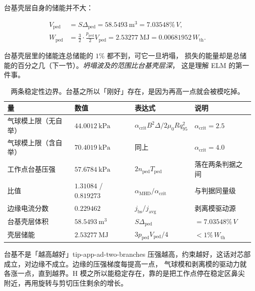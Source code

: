台基壳层自身的储能并不大：

\begin{equation}
\begin{aligned}
V_{\mathrm{ped}}&=S\Delta_{\mathrm{ped}}=58.5493\ \mathrm{m^3}=7.03548\%\,V,\\
W_{\mathrm{ped}}&=\frac{3}{2}\cdot\frac{p_{\mathrm{ped}}}{2}V_{\mathrm{ped}}
=2.53277\ \mathrm{MJ}=0.00681952\,W_{\mathrm{th}}.
\end{aligned}
\label{eq:app-ad-wped}
\end{equation}

台基壳层里的储能连总储能的 $1\%$ 都不到，可它一旦坍塌，
损失的能量却是总储能的百分之几（下一节）。\emph{坍塌波及的范围比台基壳层深}，
这是理解 ELM 的第一件事。

\begin{table}[htbp]
\centering
\small
\caption{两条稳定性边界。台基之所以「刚好」存在，是因为再高一点就会被模吃掉。}
\label{tab:app-ad-limits}
\begin{tabular}{p{3.6cm}p{3.2cm}p{3.9cm}p{4.2cm}}
\toprule
量 & 数值 & 表达式 & 说明 \\
\midrule
气球模上限（无自举） & $44.0012\ \mathrm{kPa}$ & $\alpha_{\mathrm{crit}}B^2\Delta/2\mu_0Rq_{95}^2$ & $\alpha_{\mathrm{crit}}=2.5$ \\
气球模上限（含自举） & $70.4019\ \mathrm{kPa}$ & 同上 & $\alpha_{\mathrm{crit}}=4.0$ \\
工作点台基压强 & $57.6784\ \mathrm{kPa}$ & $2n_{\mathrm{ped}}T_{\mathrm{ped}}$ & 落在两条判据之间 \\
比值 & $1.31084$ / $0.819273$ & $\alpha_{\mathrm{MHD}}/\alpha_{\mathrm{crit}}$ & 与判据同量级 \\
边缘电流分数 & $0.229462$ & $j_{\mathrm{bs}}/j_{\mathrm{avg}}$ & 剥离模驱动源 \\
台基壳层体积 & $58.5493\ \mathrm{m^3}$ & $S\Delta_{\mathrm{ped}}$ & $=7.03548\%\,V$ \\
壳层储能 & $2.53277\ \mathrm{MJ}$ & $3p_{\mathrm{ped}}V_{\mathrm{ped}}/4$ & $<1\%\,W_{\mathrm{th}}$ \\
\bottomrule
\end{tabular}

\end{table}

\begin{tip}{台基不是「越高越好」}{tip-app-ad-two-branches}
压强越高，约束越好，这话对芯部成立，对边缘不成立。边缘的压强梯度每提高一点，
气球模和剥离模的驱动力就各涨一点，直到越界。H 模之所以能稳定存在，靠的是把工作点停在稳定区鼻尖附近，再用旋转与剪切压住剩余的增长。
\end{tip}

